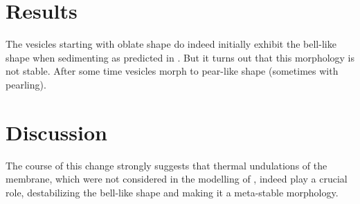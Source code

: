 \documentclass[10pt,a4paper,draft]{article}
\begin{document}
\section{Results}\label{results}
The vesicles starting with oblate shape do indeed initially exhibit the bell-like shape when sedimenting as predicted in \cite{Boedec2012}.
But it turns out that this morphology is not stable. After some time vesicles morph to pear-like shape (sometimes with pearling).

\section{Discussion}\label{discussion}
The course of this change strongly suggests that thermal undulations of the membrane, which were not considered in the modelling of \cite{Boedec2012}, indeed play a crucial role, destabilizing the bell-like shape and making it a meta-stable morphology.


\end{document}
